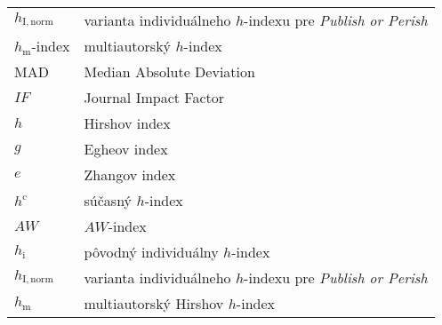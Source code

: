 \begin{flushleft}
\begin{longtable}[l]{ll}
    $h_{\mathrm{I, norm}}$  & varianta individuálneho $h$-indexu pre \emph{Publish or Perish}\\[1mm]
    $h_{\mathrm{m}}$-index & multiautorský $h$-index \\[1em]
    MAD                 & Median Absolute Deviation \\[1.5mm]
    $\mathit{IF}$       & Journal Impact Factor \\[1mm]
    $h$                 & Hirshov index \\[1mm]
    $g$                 & Egheov index \\[1mm]
    $e$                 & Zhangov index \\[1mm]
    $h^{\mathrm{c}}$       & súčasný $h$-index \\[1mm]
    $\mathit{AW}$       & $\mathit{AW}$-index \\[1mm]
    $h_{\mathrm{i}}$       & pôvodný individuálny $h$-index  \\[1mm]
    $h_{\mathrm{I, norm}}$  & varianta individuálneho $h$-indexu pre \emph{Publish or Perish}\\[1mm]
    $h_{\mathrm{m}}$       & multiautorský Hirshov $h$-index  \\[1mm]
  \end{longtable}
\end{flushleft}


